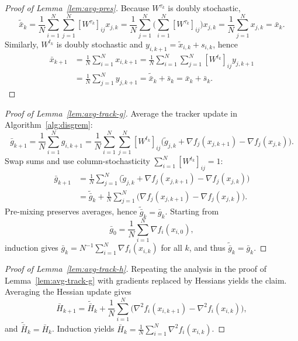 \documentclass[review,onefignum,onetabnum]{siamart171218}
\begin{document}
	\begin{proof}[Proof of Lemma~\ref{lem:avg-pres}]
		Because $W^{\tau_k}$ is doubly stochastic,
		\[
		\tilde{\bar x}_k=\frac1N\sum_{i=1}^N\sum_{j=1}^N [W^{\tau_k}]_{ij}x_{j,k}
		=\frac1N\sum_{j=1}^N\Big(\sum_{i=1}^N [W^{\tau_k}]_{ij}\Big)x_{j,k}
		=\frac1N\sum_{j=1}^N x_{j,k}=\bar x_k.
		\]
		Similarly, $W^{t_k}$ is doubly stochastic and $y_{i,k+1}=\tilde x_{i,k}+s_{i,k}$, hence
		\begin{align*}
			\bar x_{k+1}
			&=\tfrac1N\textstyle\sum_{i=1}^N x_{i,k+1}
			=\tfrac1N\textstyle\sum_{i=1}^N\sum_{j=1}^N [W^{t_k}]_{ij}y_{j,k+1}\\
			&=\tfrac1N\textstyle\sum_{j=1}^N y_{j,k+1}
			=\tilde{\bar x}_k+\bar s_k=\bar x_k+\bar s_k.
		\end{align*}
	\end{proof}
	
	\begin{proof}[Proof of Lemma~\ref{lem:avg-track-g}]
		Average the tracker update in Algorithm~\ref{alg:disgrem}:
		\[
		\bar g_{k+1}
		=\frac1N\sum_{i=1}^N g_{i,k+1}
		=\frac1N\sum_{i=1}^N\sum_{j=1}^N [W^{t_k}]_{ij}\Big(\tilde g_{j,k}+\nabla f_j(x_{j,k+1})-\nabla f_j(x_{j,k})\Big).
		\]
		Swap sums and use column-stochasticity $\sum_{i=1}^N [W^{t_k}]_{ij}=1$:
		\begin{align*}
			\bar g_{k+1}
			&=\tfrac1N\textstyle\sum_{j=1}^N
			\Big(\tilde g_{j,k}
			+\nabla f_j(x_{j,k+1})-\nabla f_j(x_{j,k})\Big)\\
			&=\tilde{\bar g}_k
			+\tfrac1N\textstyle\sum_{j=1}^N
			\big(\nabla f_j(x_{j,k+1})-\nabla f_j(x_{j,k})\big).
		\end{align*}
		Pre-mixing preserves averages, hence $\tilde{\bar g}_k=\bar g_k$.
		Starting from
		\[
		\bar g_0=\frac1N\sum_{i=1}^N \nabla f_i(x_{i,0}),
		\]
		induction gives
		$\bar g_k=N^{-1}\sum_{i=1}^N \nabla f_i(x_{i,k})$ for all $k$,
		and thus $\tilde{\bar g}_k=\bar g_k$.
	\end{proof}
	
	\begin{proof}[Proof of Lemma~\ref{lem:avg-track-h}]
		Repeating the analysis in the proof of Lemma~\ref{lem:avg-track-g} with gradients replaced by Hessians yields the claim.
		Averaging the Hessian update gives
		\[
		\bar H_{k+1}=\tilde{\bar H}_k+\frac1N\sum_{i=1}^N\big(\nabla^2 f_i(x_{i,k+1})-\nabla^2 f_i(x_{i,k})\big),
		\]
		and $\tilde{\bar H}_k=\bar H_k$. Induction yields $\bar H_k=\frac1N\sum_{i=1}^N \nabla^2 f_i(x_{i,k})$.
	\end{proof}
	
\end{document}
